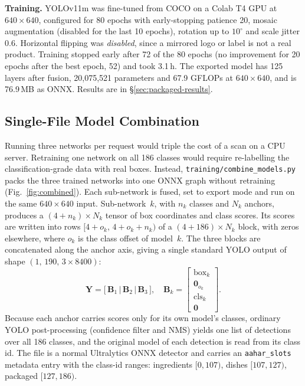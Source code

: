 \documentclass[journal]{IEEEtran}
\begin{document}
\textbf{Training.} YOLOv11m was fine-tuned from COCO on a Colab T4
GPU at $640\times640$, configured for 80 epochs with early-stopping
patience 20, mosaic augmentation (disabled for the last 10 epochs),
rotation up to $10^\circ$ and scale jitter 0.6. Horizontal flipping
was \emph{disabled}, since a mirrored logo or label is not a real
product. Training stopped early after 72 of the 80 epochs (no
improvement for 20 epochs after the best epoch, 52) and took 3.1\,h. The exported model has 125
layers after fusion, 20{,}075{,}521 parameters and 67.9 GFLOPs at
$640\times640$, and is 76.9\,MB as ONNX. Results are in
\S\ref{sec:packaged-results}.

\subsection{Single-File Model Combination}
\label{sec:combined}

Running three networks per request would triple the cost of a scan
on a CPU server. Retraining one network on all 186 classes would
require re-labelling the classification-grade data with real boxes.
Instead, \texttt{training/combine\_models.py} packs the three trained
networks into one ONNX graph without retraining
(Fig.~\ref{fig:combined}). Each sub-network is fused, set to export
mode and run on the same $640\times640$ input. Sub-network~$k$, with
$n_k$ classes and $N_k$ anchors, produces a $(4+n_k)\times N_k$
tensor of box coordinates and class scores. Its scores are written
into rows $[4+o_k,\,4+o_k+n_k)$ of a $(4+186)\times N_k$ block, with
zeros elsewhere, where $o_k$ is the class offset of model~$k$. The
three blocks are concatenated along the anchor axis, giving a single
standard YOLO output of shape $(1,\,190,\,3\times 8400)$:
\begin{equation}
\mathbf{Y} = \bigl[\,\mathbf{B}_1 \,\big|\, \mathbf{B}_2 \,\big|\, \mathbf{B}_3\,\bigr],\quad
\mathbf{B}_k = \begin{bmatrix} \mathrm{box}_k \\ \mathbf{0}_{o_k} \\ \mathrm{cls}_k \\ \mathbf{0} \end{bmatrix}.
\label{eq:combine}
\end{equation}
Because each anchor carries scores only for its own model's classes,
ordinary YOLO post-processing (confidence filter and NMS) yields one
list of detections over all 186 classes, and the original model of
each detection is read from its class id. The file is a normal
Ultralytics ONNX detector and carries an \texttt{aahar\_slots}
metadata entry with the class-id ranges:
ingredients $[0,107)$, dishes $[107,127)$, packaged $[127,186)$.
\end{document}
